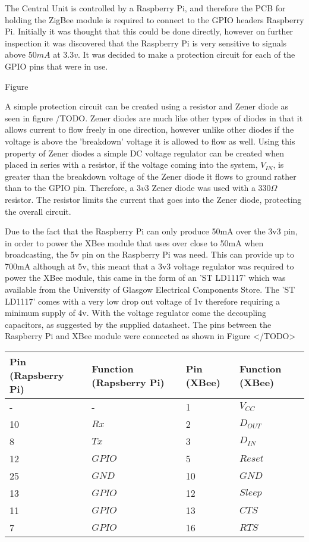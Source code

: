 The Central Unit is controlled by a Raspberry Pi, and therefore the PCB for holding the ZigBee module is required to connect to the GPIO headers Raspberry Pi.  Initially it was thought that this could be done directly, however on further inspection it was discovered that the Raspberry Pi is very sensitive to signals above \(50mA\) at \(3.3v\). It was decided to make a protection circuit for each of the GPIO pins that were in use. 

Figure

A simple protection circuit can be created using a resistor and Zener diode as seen in figure /TODO.  Zener diodes are much like other types of diodes in that it allows current to flow freely in one direction, however unlike other diodes if the voltage is above the 'breakdown' voltage it is allowed to flow as well. Using this property of Zener diodes a simple DC voltage regulator can be created when placed in series with a resistor, if the voltage coming into the system, \(V_{IN}\), is greater than the breakdown voltage of the Zener diode it flows to ground rather than to the GPIO pin. Therefore, a \(3v3\) Zener diode was used with a \(330\Omega\) resistor. The resistor limits the current that goes into the Zener diode, protecting the overall circuit.

Due to the fact that the Raspberry Pi can only produce 50mA over the 3v3 pin, in order to power the XBee module that uses over close to 50mA when broadcasting, the 5v pin on the Raspberry Pi was need. This can provide up to 700mA although at 5v, this meant that a 3v3 voltage regulator was required to power the XBee module, this came in the form of an 'ST LD1117' which was available from the University of Glasgow Electrical Components Store. The 'ST LD1117' comes with a very low drop out voltage of 1v therefore requiring a minimum supply of 4v. With the voltage regulator come the decoupling capacitors, as suggested by the supplied datasheet.
The pins between the Raspberry Pi and XBee module were connected as shown in Figure </TODO>

\begin{center}
  \begin{tabular}{| l | l | l | l |}
    \hline
    \bf{Pin (Rapsberry Pi)} & \bf{Function (Rapsberry Pi)} & \bf{Pin (XBee)} & \bf{Function (XBee)} \\ \hline
     - & - & 1 & \(V_{CC}\) \\ \hline
	10 & \(Rx\) & 2 & \(D_{OUT}\) \\ \hline
	8 & \(Tx\) & 3 & \(D_{IN}\) \\ \hline
	12 & \(GPIO\) & 5 & \(Reset\) \\ \hline
	25 & \(GND\) & 10 & \(GND\) \\ \hline
	13 & \(GPIO\) & 12 & \(Sleep\) \\ \hline
	11 & \(GPIO\) & 13 & \(CTS\) \\ \hline
	7 & \(GPIO\) & 16 & \(RTS\) \\
    \hline
  \end{tabular}
\end{center}

